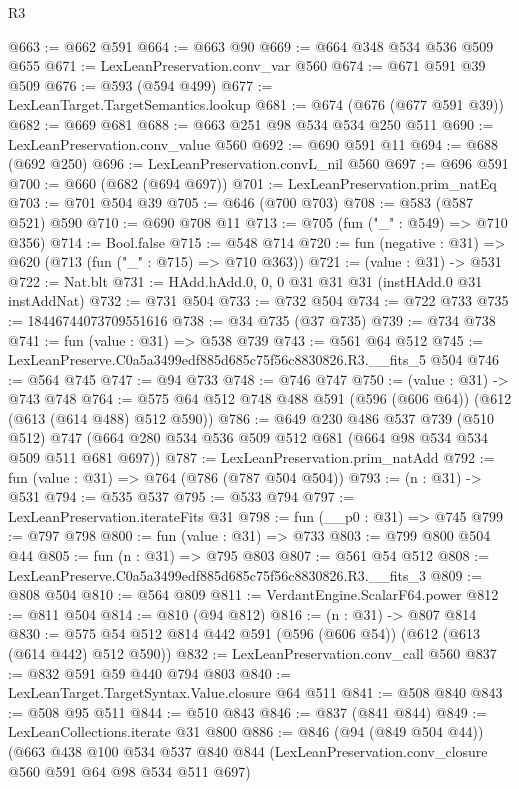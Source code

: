 \begin{lexlean}{R3}
\begin{coremodule}
@663 := @662 @591
@664 := @663 @90
@669 := @664 @348 @534 @536 @509 @655
@671 := LexLeanPreservation.conv_var @560
@674 := @671 @591 @39 @509
@676 := @593 (@594 @499)
@677 := LexLeanTarget.TargetSemantics.lookup
@681 := @674 (@676 (@677 @591 @39))
@682 := @669 @681
@688 := @663 @251 @98 @534 @534 @250 @511
@690 := LexLeanPreservation.conv_value @560
@692 := @690 @591 @11
@694 := @688 (@692 @250)
@696 := LexLeanPreservation.convL_nil @560
@697 := @696 @591
@700 := @660 (@682 (@694 @697))
@701 := LexLeanPreservation.prim_natEq
@703 := @701 @504 @39
@705 := @646 (@700 @703)
@708 := @583 (@587 @521) @590
@710 := @690 @708 @11
@713 := @705 (fun ("_" : @549) => @710 @356)
@714 := Bool.false
@715 := @548 @714
@720 := fun (negative : @31) => @620 (@713 (fun ("_" : @715) => @710 @363))
@721 := (value : @31) -> @531
@722 := Nat.blt
@731 := HAdd.hAdd.{0, 0, 0} @31 @31 @31 (instHAdd.{0} @31 instAddNat)
@732 := @731 @504
@733 := @732 @504
@734 := @722 @733
@735 := 18446744073709551616
@738 := @34 @735 (@37 @735)
@739 := @734 @738
@741 := fun (value : @31) => @538 @739
@743 := @561 @64 @512
@745 := LexLeanPreserve.C0a5a3499edf885d685c75f56c8830826.R3.__fits_5 @504
@746 := @564 @745
@747 := @94 @733
@748 := @746 @747
@750 := (value : @31) -> @743 @748
@764 := @575 @64 @512 @748 @488 @591 (@596 (@606 @64)) (@612 (@613 (@614 @488) @512 @590))
@786 := @649
    @230
    @486
    @537
    @739
    (@510 @512)
    @747
    (@664 @280 @534 @536 @509 @512 @681 (@664 @98 @534 @534 @509 @511 @681 @697))
@787 := LexLeanPreservation.prim_natAdd
@792 := fun (value : @31) => @764 (@786 (@787 @504 @504))
@793 := (n : @31) -> @531
@794 := @535 @537
@795 := @533 @794
@797 := LexLeanPreservation.iterateFits @31
@798 := fun (__p0 : @31) => @745
@799 := @797 @798
@800 := fun (value : @31) => @733
@803 := @799 @800 @504 @44
@805 := fun (n : @31) => @795 @803
@807 := @561 @54 @512
@808 := LexLeanPreserve.C0a5a3499edf885d685c75f56c8830826.R3.__fits_3
@809 := @808 @504
@810 := @564 @809
@811 := VerdantEngine.ScalarF64.power
@812 := @811 @504
@814 := @810 (@94 @812)
@816 := (n : @31) -> @807 @814
@830 := @575 @54 @512 @814 @442 @591 (@596 (@606 @54)) (@612 (@613 (@614 @442) @512 @590))
@832 := LexLeanPreservation.conv_call @560
@837 := @832 @591 @59 @440 @794 @803
@840 := LexLeanTarget.TargetSyntax.Value.closure @64 @511
@841 := @508 @840
@843 := @508 @95 @511
@844 := @510 @843
@846 := @837 (@841 @844)
@849 := LexLeanCollections.iterate @31 @800
@886 := @846
    (@94 (@849 @504 @44))
    (@663
      @438
      @100
      @534
      @537
      @840
      @844
      (LexLeanPreservation.conv_closure @560 @591 @64 @98 @534 @511 @697)

\end{coremodule}
\end{lexlean}
